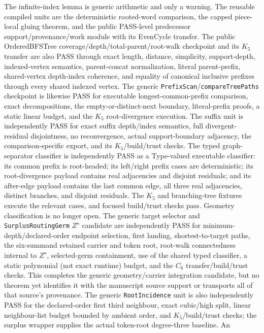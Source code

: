 \documentclass[11pt]{article}
\begin{document}
The infinite-index lemma is generic arithmetic and only a warning.  The
reusable compiled units are the deterministic rooted-word comparison, the
capped piece-local gluing theorem, and the public PASS-level predecessor
support/provenance/work module with its EvenCycle transfer.  The
public OrderedBFSTree coverage/depth/total-parent/root-walk checkpoint and its
$K_5$ transfer are also PASS through exact length, distance, simplicity,
support-depth, indexed-vertex semantics, parent-concat normalization, literal
parent-prefix, shared-vertex depth-index coherence, and equality of canonical
inclusive prefixes through every shared indexed vertex.  The generic
\texttt{PrefixScan}/\texttt{compareTreePaths} checkpoint is likewise PASS for
executable longest-common-prefix comparison, exact decompositions, the
empty-or-distinct-next boundary, literal-prefix proofs, a static linear budget,
and the $K_5$ root-divergence execution.  The suffix unit is independently PASS
for exact suffix depth/index semantics, full divergent-residual disjointness,
no reconvergence, actual support-boundary adjacency, the comparison-specific
export, and its $K_5$/build/trust checks.  The typed graph-separator classifier
is independently PASS as a Type-valued executable classifier: its common
prefix is root-headed; its left/right prefix cases are deterministic; its
root-divergence payload contains real adjacencies and disjoint residuals; and
its after-edge payload contains the last common edge, all three real
adjacencies, distinct branches, and disjoint residuals.  The $K_5$ and
branching-tree fixtures execute the relevant cases, and focused build/trust
checks pass.  Geometry classification is no longer open.  The generic target
selector and \texttt{SurplusRoutingGerm} $Z^\star$ candidate are independently
PASS for minimum-depth/declared-order endpoint selection, first landing,
shortest-to-target paths, the six-summand retained carrier and token root,
root-walk connectedness internal to $Z^\star$, selected-germ containment, use
of the shared typed classifier, a static polynomial (not exact runtime) budget,
and the $C_6$ transfer/build/trust checks.  This completes the generic
geometry/carrier integration candidate, but no theorem yet identifies it with
the manuscript source support or transports all of that source's provenance.
The generic \texttt{RootIncidence} unit is also independently PASS for the
declared-order first third neighbour, exact cubic/high split, linear
neighbour-list budget bounded by ambient order, and $K_5$/build/trust checks;
the surplus wrapper supplies the actual token-root degree-three baseline.  An
\end{document}
